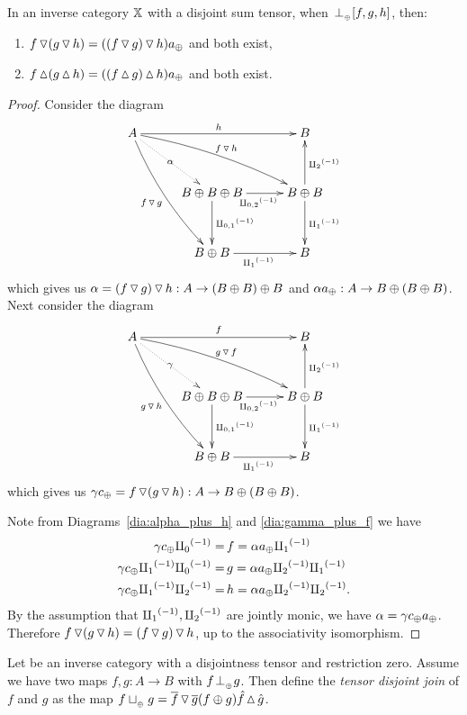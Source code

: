 \begin{lemma}\label{lem:tjdown_and_tjup_associate}
  In an inverse category $\mathbb{X}$ with a disjoint sum tensor, when ${}_{{}_{}}{\perp_{{}_{\oplus}}} [f,g,h]$, then:
  \begin{enumerate}[{(}i{)}]
    \item   $f \operatorname{\triangledown} (g \operatorname{\triangledown} h) = ((f \operatorname{\triangledown} g) \operatorname{\triangledown} h) a_{\oplus}$ and both exist,
    \item   $f \operatorname{\vartriangle} (g \operatorname{\vartriangle} h) = ((f \operatorname{\vartriangle} g) \operatorname{\vartriangle} h) a_{\oplus}$ and both exist.
  \end{enumerate}
\end{lemma}
\begin{proof}
  Consider the diagram
  \begin{equation}
    \xymatrix@C+5pt@R+10pt{
      A \ar@/_/[ddr]_{f\tjdown g} \ar@/^/[drr]^{f\tjdown h} \ar@{.>}[dr]|-{\alpha} \ar[rr]^{h}
        & & B \\
        & B\+B\+B \ar[d]^{\icp{0,1}} \ar[r]_{\icp{0,2}} & B\+B \ar[d]^{\icpa} \ar[u]_{\icpb} \\
        & B\+B \ar[r]_{\icpa} & B
    }\label{dia:alpha_plus_h}
  \end{equation}
  which gives us $\alpha = (f \operatorname{\triangledown} g) \operatorname{\triangledown} h: A \to (B\oplus B)\oplus B$ and
  $\alpha a_{\oplus} :A \to B\oplus(B\oplus B)$. Next consider the diagram
  \begin{equation}
    \xymatrix@C+5pt@R+10pt{
      A \ar@/_/[ddr]_{g\tjdown h} \ar@/^/[drr]^{g\tjdown f} \ar@{.>}[dr]|-{\gamma} \ar[rr]^{f}
        & & B \\
        & B\+B\+B \ar[d]^{\icp{0,1}} \ar[r]_{\icp{0,2}} & B\+B \ar[d]^{\icpa} \ar[u]_{\icpb} \\
        & B\+B \ar[r]_{\icpa} & B
    }\label{dia:gamma_plus_f}
  \end{equation}
  which gives us $\gamma c_{\oplus} = f \operatorname{\triangledown} (g\operatorname{\triangledown} h): A \to B\oplus(B\oplus B)$.

  Note from Diagrams~\ref{dia:alpha_plus_h} and \ref{dia:gamma_plus_f} we have
  \begin{align*}
    \gamma c_{\oplus}  {\amalg_{0}}^{(-1)}         =\, &f  = \alpha a_{\oplus}{\amalg_{1}}^{(-1)}\\
    \gamma c_{\oplus}  {\amalg_{1}}^{(-1)} {\amalg_{0}}^{(-1)} =\, &g  = \alpha a_{\oplus}{\amalg_{2}}^{(-1)}{\amalg_{1}}^{(-1)}\\
    \gamma c_{\oplus}  {\amalg_{1}}^{(-1)} {\amalg_{2}}^{(-1)}   =\, & h = \alpha a_{\oplus}{\amalg_{2}}^{(-1)}{\amalg_{2}}^{(-1)}.
  \end{align*}
  By the assumption that ${\amalg_{1}}^{(-1)}, {\amalg_{2}}^{(-1)}$ are jointly monic, we have
  $\alpha = \gamma c_{\oplus}  a_{\oplus}$. Therefore $f \operatorname{\triangledown} (g \operatorname{\triangledown} h) = (f \operatorname{\triangledown} g) \operatorname{\triangledown} h$,
  up to the associativity isomorphism.
\end{proof}
\begin{definition}\label{def:tensor_disjoint_join}
  Let \X be an inverse category with a disjointness tensor and restriction zero. Assume we have two
  maps $f,g: A \to B$ with $f{}_{{}_{}}{\perp_{{}_{\oplus}}} g$. Then define the \emph{tensor disjoint join} of $f$ and $g$
  as the map $f \sqcup_{{_{\oplus}}} g = \overline{f}\operatorname{\triangledown}\overline{g} (f\oplus g) \hat{f}\operatorname{\vartriangle}\hat{g}$.
\end{definition}


